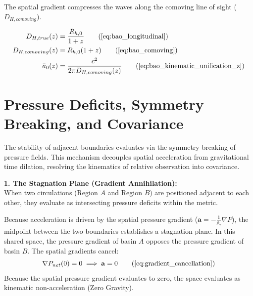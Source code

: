 The spatial gradient compresses the waves along the comoving line of sight ($D_{H,comoving}$). 

\begin{tcolorbox}[recallbox, title={\ref{box:bao_lensing}. BAO \& Kinematic Unification}]
\begin{align}
    D_{H,true}(z) &= \frac{R_{h,0}}{1+z} \tag{\ref{eq:bao_longitudinal}} \\
    D_{H,comoving}(z) &= R_{h,0}(1+z) \tag{\ref{eq:bao_comoving}} \\
    \bar{a}_0(z) &= \frac{c^2}{2\pi D_{H,comoving}(z)} \tag{\ref{eq:bao_kinematic_unification_z}}
\end{align}
\end{tcolorbox}

\section{Pressure Deficits, Symmetry Breaking, and Covariance}
\label{sec:deriv_auxetic_symmetry_covariance}

The stability of adjacent boundaries evaluates via the symmetry breaking of pressure fields. This mechanism decouples spatial acceleration from gravitational time dilation, resolving the kinematics of relative observation into covariance. %

\textbf{1. The Stagnation Plane (Gradient Annihilation):} \\
When two circulations (Region $A$ and Region $B$) are positioned adjacent to each other, they evaluate as intersecting pressure deficits within the metric. %

Because acceleration is driven by the spatial pressure gradient ($\mathbf{a} = -\frac{1}{\rho_{\tau}} \nabla P$), the midpoint between the two boundaries establishes a stagnation plane. In this shared space, the pressure gradient of basin $A$ opposes the pressure gradient of basin $B$. The spatial gradients cancel: %
\begin{equation}
    \nabla P_{net}(0) = 0 \implies \mathbf{a} = 0 \tag{\ref{eq:gradient_cancellation}}
\end{equation}
Because the spatial pressure gradient evaluates to zero, the space evaluates as kinematic non-acceleration (Zero Gravity). %

